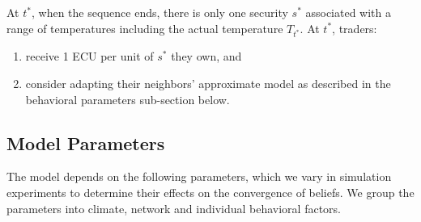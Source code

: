 \documentclass{wscpaperproc}\usepackage[]{graphicx}\usepackage[]{color}
\begin{document}
At $t^*$, when the sequence ends, there is only one security $s^*$ associated with a range of temperatures including the actual temperature $T_{t^*}$. 
At $t^*$, traders:

\begin{enumerate}
  \item  receive 1 ECU per unit of $s^*$ they own, and
  \item consider adapting their neighbors' approximate model as described in the behavioral parameters sub-section below.
\end{enumerate}

\subsection{Model Parameters}
  
The model depends on the following parameters, which we vary in simulation experiments to determine their effects on the convergence of beliefs. We group the parameters into climate, network and individual behavioral factors.
\end{document}
